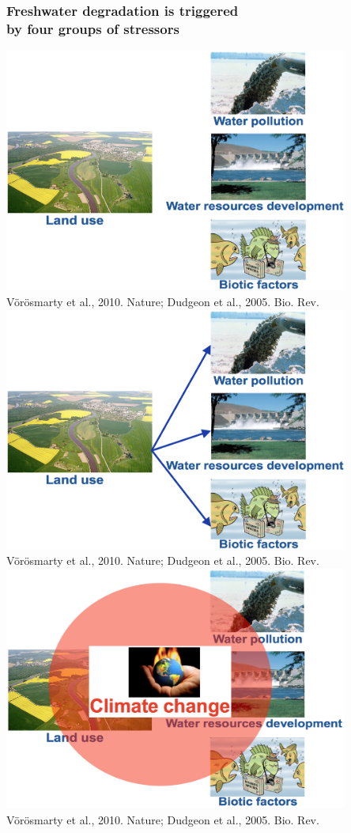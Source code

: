\documentclass[10pt, compress]{beamer}
\begin{document}
\begin{frame}[fragile]
  \frametitle{Freshwater degradation is triggered \protect\\ by four groups of stressors}
  \centering
     {\includegraphics[width=0.85\textwidth]{images/Stressors.png}\\
     \hspace{3cm} \footnotesize Vörösmarty et al., 2010. Nature; Dudgeon et al., 2005. Bio. Rev.}
      {\includegraphics[width=0.85\textwidth]{images/SLink.png}\\
     \hspace{3cm} \footnotesize Vörösmarty et al., 2010. Nature; Dudgeon et al., 2005. Bio. Rev.}
     {\includegraphics[width=0.85\textwidth]{images/SClimate.png}\\
    \hspace{3cm} \footnotesize Vörösmarty et al., 2010. Nature; Dudgeon et al., 2005. Bio. Rev.}
\end{frame}
\end{document}
